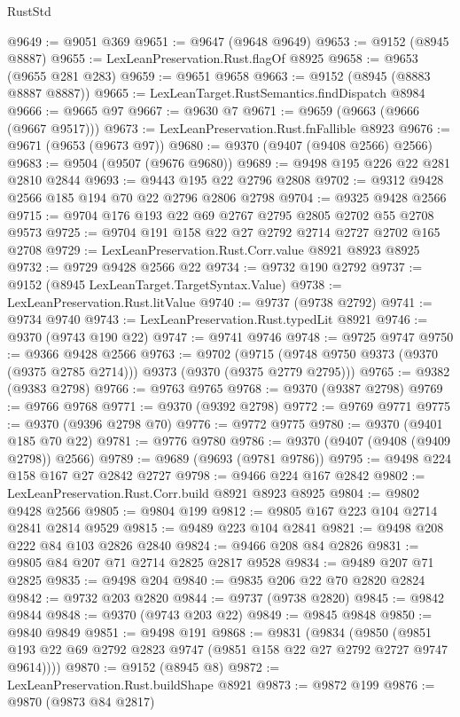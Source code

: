 \begin{lexlean}{RustStd}
\begin{coremodule}
{\begin{coremodule}
{{{{{{{{{{{{{{{{{{{{{{{{{{{{{{{{{{{{{{{@9649 := @9051 @369
@9651 := @9647 (@9648 @9649)
@9653 := @9152 (@8945 @8887)
@9655 := LexLeanPreservation.Rust.flagOf @8925
@9658 := @9653 (@9655 @281 @283)
@9659 := @9651 @9658
@9663 := @9152 (@8945 (@8883 @8887 @8887))
@9665 := LexLeanTarget.RustSemantics.findDispatch @8984
@9666 := @9665 @97
@9667 := @9630 @7
@9671 := @9659 (@9663 (@9666 (@9667 @9517)))
@9673 := LexLeanPreservation.Rust.fnFallible @8923
@9676 := @9671 (@9653 (@9673 @97))
@9680 := @9370 (@9407 (@9408 @2566) @2566)
@9683 := @9504 (@9507 (@9676 @9680))
@9689 := @9498 @195 @226 @22 @281 @2810 @2844
@9693 := @9443 @195 @22 @2796 @2808
@9702 := @9312 @9428 @2566 @185 @194 @70 @22 @2796 @2806 @2798
@9704 := @9325 @9428 @2566
@9715 := @9704 @176 @193 @22 @69 @2767 @2795 @2805 @2702 @55 @2708 @9573
@9725 := @9704 @191 @158 @22 @27 @2792 @2714 @2727 @2702 @165 @2708
@9729 := LexLeanPreservation.Rust.Corr.value @8921 @8923 @8925
@9732 := @9729 @9428 @2566 @22
@9734 := @9732 @190 @2792
@9737 := @9152 (@8945 LexLeanTarget.TargetSyntax.Value)
@9738 := LexLeanPreservation.Rust.litValue
@9740 := @9737 (@9738 @2792)
@9741 := @9734 @9740
@9743 := LexLeanPreservation.Rust.typedLit @8921
@9746 := @9370 (@9743 @190 @22)
@9747 := @9741 @9746
@9748 := @9725 @9747
@9750 := @9366 @9428 @2566
@9763 := @9702
    (@9715 (@9748 @9750 @9373 (@9370 (@9375 @2785 @2714))) @9373 (@9370 (@9375 @2779 @2795)))
@9765 := @9382 (@9383 @2798)
@9766 := @9763 @9765
@9768 := @9370 (@9387 @2798)
@9769 := @9766 @9768
@9771 := @9370 (@9392 @2798)
@9772 := @9769 @9771
@9775 := @9370 (@9396 @2798 @70)
@9776 := @9772 @9775
@9780 := @9370 (@9401 @185 @70 @22)
@9781 := @9776 @9780
@9786 := @9370 (@9407 (@9408 (@9409 @2798)) @2566)
@9789 := @9689 (@9693 (@9781 @9786))
@9795 := @9498 @224 @158 @167 @27 @2842 @2727
@9798 := @9466 @224 @167 @2842
@9802 := LexLeanPreservation.Rust.Corr.build @8921 @8923 @8925
@9804 := @9802 @9428 @2566
@9805 := @9804 @199
@9812 := @9805 @167 @223 @104 @2714 @2841 @2814 @9529
@9815 := @9489 @223 @104 @2841
@9821 := @9498 @208 @222 @84 @103 @2826 @2840
@9824 := @9466 @208 @84 @2826
@9831 := @9805 @84 @207 @71 @2714 @2825 @2817 @9528
@9834 := @9489 @207 @71 @2825
@9835 := @9498 @204
@9840 := @9835 @206 @22 @70 @2820 @2824
@9842 := @9732 @203 @2820
@9844 := @9737 (@9738 @2820)
@9845 := @9842 @9844
@9848 := @9370 (@9743 @203 @22)
@9849 := @9845 @9848
@9850 := @9840 @9849
@9851 := @9498 @191
@9868 := @9831
    (@9834
      (@9850 (@9851 @193 @22 @69 @2792 @2823 @9747 (@9851 @158 @22 @27 @2792 @2727 @9747 @9614))))
@9870 := @9152 (@8945 @8)
@9872 := LexLeanPreservation.Rust.buildShape @8921
@9873 := @9872 @199
@9876 := @9870 (@9873 @84 @2817)
}}}}}}}}}}}}}}}}}}}}}}}}}}}}}}}}}}}}}}}
\end{coremodule}}
\end{coremodule}
\end{lexlean}

